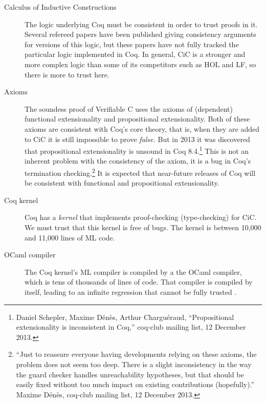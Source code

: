\documentclass[prodmode,acmtoplas]{acmsmall}
\begin{document}
\begin{description}
\item[\hspace*{-1em}Calculus of Inductive Constructions]
The logic underlying Coq must be consistent in order to trust proofs in it.
Several refereed papers have been published giving consistency arguments
for versions of this logic,
but these papers have not fully tracked the particular logic implemented
in Coq.  In general, CiC is a stronger and more complex logic than
some of its competitors such as HOL and LF, so there is more to trust here.

\item[\hspace*{-1em}Axioms]
The soundess proof of Verifiable C uses the axioms of
(dependent) functional extensionality
and propositional extensionality.
Both of these axioms are consistent
with Coq's core theory, that is,
when they are added to CiC it is still impossible to prove \emph{false.}
But in 2013 it was discovered that propositional extensionality
is unsound in Coq 8.4.\footnote{Daniel Schepler, 
Maxime D\'en\`es, Arthur Chargu\'eraud,
``Propositional extensionality is inconsistent in Coq,''
coq-club mailing list, 12 December 2013.}
This is not an inherent problem with the consistency of
the axiom, it is a bug in Coq's termination checking.\footnote{
``Just to reassure everyone having developments relying on these
  axioms, the problem does not seem too deep. There is a slight
  inconsistency in the way the guard checker handles unreachability
  hypotheses, but that should be easily fixed without too much impact
  on existing contributions (hopefully).''
Maxime D\'en\`es, coq-club mailing list, 12 December 2013.}
It is expected that near-future releases of Coq will be consistent with
functional and propositional extensionality.

\item[\hspace*{-1em}Coq kernel]
Coq has a \emph{kernel} that implements proof-checking (type-checking)
for CiC.  We must trust that this kernel is free of bugs.
The kernel is between 10,000 and 11,000 lines of ML code.

\item[\hspace*{-1em}OCaml compiler]
The Coq kernel's ML compiler is compiled by a the OCaml
compiler, which is tens of thousands of lines of code.
That compiler is compiled by itself, leading to an
infinite regression that cannot be fully trusted \cite{thompson84}.


\end{description}
\end{document}
